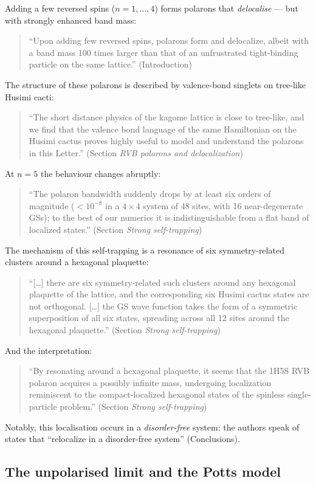 Adding a few reversed spins ($n=1,\ldots,4$) forms polarons that
\emph{delocalise} --- but with strongly enhanced band mass:
\begin{quote}\QM
``Upon adding few reversed spins, polarons form and delocalize, albeit with
a band mass 100 times larger than that of an unfrustrated tight-binding
particle on the same lattice.'' (Introduction)
\end{quote}
The structure of these polarons is described by valence-bond singlets on
tree-like Husimi cacti:
\begin{quote}\QM
``The short distance physics of the kagome lattice is close to tree-like,
and we find that the valence bond language of the same Hamiltonian on the
Husimi cactus proves highly useful to model and understand the polarons in
this Letter.'' (Section \emph{RVB polarons and delocalization})
\end{quote}
At $n=5$ the behaviour changes abruptly:
\begin{quote}\QM
``The polaron bandwidth suddenly drops by at least six orders of magnitude
($<10^{-8}$ in a $4\times4$ system of 48 sites, with 16 near-degenerate
GSs); to the best of our numerics it is indistinguishable from a flat band
of localized states.'' (Section \emph{Strong self-trapping})
\end{quote}
The mechanism of this self-trapping is a resonance of six symmetry-related
clusters around a hexagonal plaquette:
\begin{quote}\QM
``[\ldots] there are six symmetry-related such clusters around any hexagonal
plaquette of the lattice, and the corresponding six Husimi cactus states are
not orthogonal. [\ldots] the GS wave function takes the form of a symmetric
superposition of all six states, spreading across all 12 sites around the
hexagonal plaquette.'' (Section \emph{Strong self-trapping})
\end{quote}
And the interpretation:
\begin{quote}\QM
``By resonating around a hexagonal plaquette, it seems that the 1H5S RVB
polaron acquires a possibly infinite mass, undergoing localization
reminiscent to the compact-localized hexagonal states of the spinless
single-particle problem.'' (Section \emph{Strong self-trapping})
\end{quote}
Notably, this localisation occurs in a \emph{disorder-free} system: the
authors speak of states that ``relocalize in a disorder-free system''
(Conclusions).

\subsection{The unpolarised limit and the Potts model}

